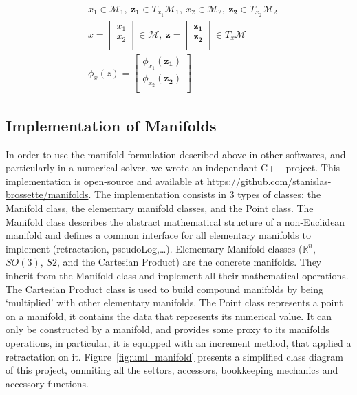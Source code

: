 \begin{align}
  &x_1\in \mathcal{M}_1,\ \mathbf{z_1}\in T_{x_1}\mathcal{M}_1,\ x_2\in \mathcal{M}_2,\ \mathbf{z_2}\in T_{x_2}\mathcal{M}_2\\
  &x=\begin{bmatrix}
    x_1\\x_2\\
  \end{bmatrix}\in \mathcal{M},\ \mathbf{z}=\begin{bmatrix}
    \mathbf{z_1}\\ \mathbf{z_2}\\
  \end{bmatrix}\in T_x\mathcal{M}\\
  &\phi_x(z) = \begin{bmatrix}
    \phi_{x_1}(\mathbf{z_1})\\
    \phi_{x_2}(\mathbf{z_2})\\
  \end{bmatrix}
\end{align}


\subsection{Implementation of Manifolds}
\label{sub:implementation_of_manifolds}

In order to use the manifold formulation described above in other softwares, and particularly in a numerical solver, we wrote an independant C++ project.
This implementation is open-source and available at \href{https://github.com/stanislas-brossette/manifolds}{https://github.com/stanislas-brossette/manifolds}.
The implementation consists in 3 types of classes: the Manifold class, the elementary manifold classes, and the Point class.
The Manifold class describes the abstract mathematical structure of a non-Euclidean manifold and defines a common interface for all elementary manifolds to implement (retractation, pseudoLog,\ldots).
Elementary Manifold classes ($\mathbb{R}^n$, $SO(3)$, $S2$, and the Cartesian Product) are the concrete manifolds.
They inherit from the Manifold class and implement all their mathematical operations.
The Cartesian Product class is used to build compound manifolds by being `multiplied' with other elementary manifolds.
The Point class represents a point on a manifold, it contains the data that represents its numerical value.
It can only be constructed by a manifold, and provides some proxy to its manifolds operations, in particular, it is equipped with an increment method, that applied a retractation on it.
Figure~\ref{fig:uml_manifold} presents a simplified class diagram of this project, ommiting all the settors, accessors, bookkeeping mechanics and accessory functions.

